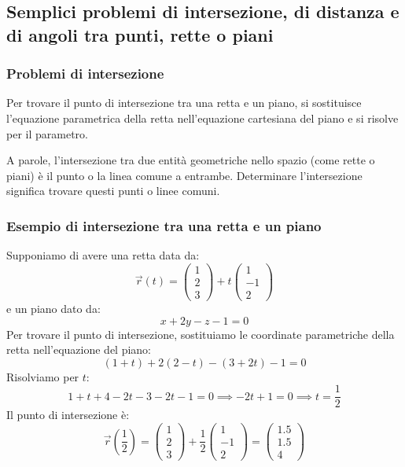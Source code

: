 \documentclass{article}
\begin{document}
\newpage
\subsection{Semplici problemi di intersezione, di distanza e di angoli tra punti, rette o piani}

\subsubsection{Problemi di intersezione}
Per trovare il punto di intersezione tra una retta e un piano, si sostituisce l'equazione
parametrica della retta nell'equazione cartesiana del piano e si risolve per il parametro.

A parole, l'intersezione tra due entità geometriche nello spazio (come rette o piani) è il
punto o la linea comune a entrambe. Determinare l'intersezione significa trovare questi punti
o linee comuni.

\subsubsection{Esempio di intersezione tra una retta e un piano}
Supponiamo di avere una retta data da:
\[
    \vec{r}(t) = \begin{pmatrix} 1 \\ 2 \\ 3 \end{pmatrix}
    + t \begin{pmatrix} 1 \\ -1 \\ 2 \end{pmatrix}
\]
e un piano dato da:
\[
    x + 2y - z - 1 = 0
\]
Per trovare il punto di intersezione, sostituiamo le coordinate parametriche della retta
nell'equazione del piano:
\[
    (1 + t) + 2(2 - t) - (3 + 2t) - 1 = 0
\]
Risolviamo per \(t\):
\[
    1 + t + 4 - 2t - 3 - 2t - 1 = 0 \implies -2t + 1 = 0 \implies t = \frac{1}{2}
\]
Il punto di intersezione è:
\[
    \vec{r}\left(\frac{1}{2}\right) = \begin{pmatrix} 1 \\ 2 \\ 3 \end{pmatrix}
    + \frac{1}{2} \begin{pmatrix} 1 \\ -1 \\ 2 \end{pmatrix} =
    \begin{pmatrix} 1.5 \\ 1.5 \\ 4 \end{pmatrix}
\]
\end{document}
